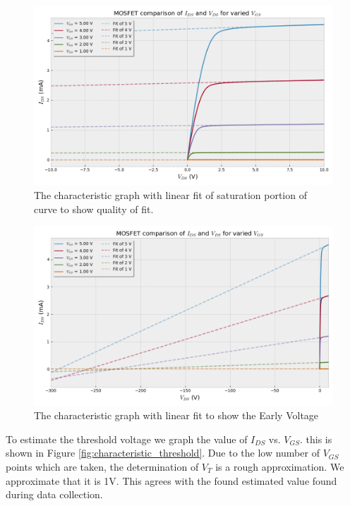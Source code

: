 \begin{figure}[ht]
    \centering
    \includegraphics[width=.825\linewidth]{figures/characteristic_tight_fit.png}
    \caption{The characteristic graph with linear fit of saturation portion of curve to show quality of fit.}
    \label{fig:characteristic_tight_fit}
\end{figure}

\begin{figure}[ht]
    \centering
    \includegraphics[width=.825\linewidth]{figures/characteristic_wide_fit.png}
    \caption{The characteristic graph with linear fit to show the Early Voltage}
    \label{fig:characteristic_wide_fit}
\end{figure}

\clearpage

To estimate the threshold voltage we graph the value of $I_{DS}$ vs. $V_{GS}$. this is shown in Figure \ref{fig:characteristic_threshold}. Due to the low number of $V_{GS}$ points which are taken, the determination of $V_T$ is a rough approximation. We approximate that it is 1V. This agrees with the found estimated value found during data collection.

